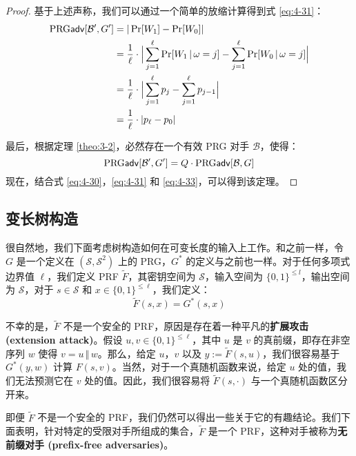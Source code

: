 \begin{proof}
基于上述声称，我们可以通过一个简单的放缩计算得到式 \ref{eq:4-31}：
\[
\begin{aligned}
{\rm PRG\mathsf{adv}}[\mathcal{B}',G']
&=|\Pr[W_1]-\Pr[W_0]|\\
&=\frac{1}{\ell}\cdot\Big\lvert\sum_{j=1}^\ell\Pr[W_1\,|\,\omega=j]-\sum_{j=1}^\ell\Pr[W_0\,|\,\omega=j]\Big\rvert\\
&=\frac{1}{\ell}\cdot\Big\lvert\sum_{j=1}^\ell p_j-\sum_{j=1}^\ell p_{j-1}\Big\rvert\\
&=\frac{1}{\ell}\cdot|p_\ell-p_0|
\end{aligned}
\]

最后，根据定理 \ref{theo:3-2}，必然存在一个有效 PRG 对手 $\mathcal{B}$，使得：
\begin{equation}\label{eq:4-33}
{\rm PRG\mathsf{adv}}[\mathcal{B}',G']=Q\cdot{\rm PRG\mathsf{adv}}[\mathcal{B},G]
\end{equation}
现在，结合式 \ref{eq:4-30}，\ref{eq:4-31} 和 \ref{eq:4-33}，可以得到该定理。
\end{proof}

\subsection{变长树构造}\label{subsec:4-6-1}

很自然地，我们下面考虑树构造如何在可变长度的输入上工作。和之前一样，令 $G$ 是一个定义在 $(\mathcal{S},\mathcal{S}^2)$ 上的 PRG，$G^*$ 的定义与之前也一样。对于任何多项式边界值 $\ell$，我们定义 PRF $\tilde F$，其密钥空间为 $\mathcal{S}$，输入空间为 $\{0,1\}^{\leq l}$，输出空间为 $\mathcal{S}$，对于 $s\in\mathcal{S}$ 和 $x\in\{0,1\}^{\leq\ell}$，我们定义：
\[
\tilde F(s,x)=G^*(s,x)
\]

不幸的是，$\tilde F$ 不是一个安全的 PRF，原因是存在着一种平凡的\textbf{扩展攻击 (extension attack)}。假设 $u,v\in\{0,1\}^{\leq\ell}$，其中 $u$ 是 $v$ 的真前缀，即存在非空序列 $w$ 使得 $v=u\,\Vert\,w$。那么，给定 $u$，$v$ 以及 $y:=\tilde F(s,u)$，我们很容易基于 $G^*(y,w)$ 计算 $F(s,v)$。当然，对于一个真随机函数来说，给定 $u$ 处的值，我们无法预测它在 $v$ 处的值。因此，我们很容易将 $\tilde F(s,\cdot)$ 与一个真随机函数区分开来。

即便 $\tilde F$ 不是一个安全的 PRF，我们仍然可以得出一些关于它的有趣结论。我们下面表明，针对特定的受限对手所组成的集合，$\tilde F$ 是一个 PRF，这种对手被称为\textbf{无前缀对手 (prefix-free adversaries)}。


